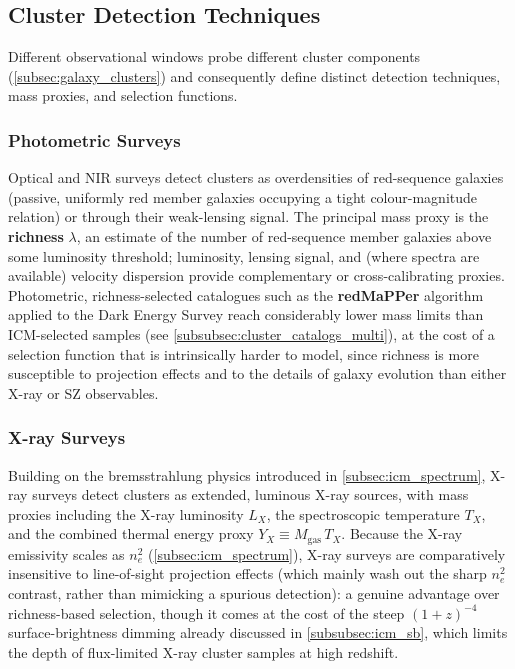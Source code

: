 \vspace{-0.5em}

\subsection{Cluster Detection Techniques} \label{subsec:cluster_detection}

Different observational windows probe different cluster components (\cref{subsec:galaxy_clusters}) and consequently define distinct detection techniques, mass proxies, and selection functions.

\subsubsection{Photometric Surveys} \label{subsubsec:photometric_detection}

Optical and NIR surveys detect clusters as overdensities of red-sequence galaxies (passive, uniformly red member galaxies occupying a tight colour-magnitude relation) or through their weak-lensing signal. The principal mass proxy is the \textbf{richness} $\lambda$, an estimate of the number of red-sequence member galaxies above some luminosity threshold; luminosity, lensing signal, and (where spectra are available) velocity dispersion provide complementary or cross-calibrating proxies. Photometric, richness-selected catalogues such as the \textbf{redMaPPer} algorithm applied to the Dark Energy Survey reach considerably lower mass limits than ICM-selected samples (see \cref{subsubsec:cluster_catalogs_multi}), at the cost of a selection function that is intrinsically harder to model, since richness is more susceptible to projection effects and to the details of galaxy evolution than either X-ray or SZ observables.


\subsubsection{X-ray Surveys} \label{subsubsec:xray_detection}

Building on the bremsstrahlung physics introduced in \cref{subsec:icm_spectrum}, X-ray surveys detect clusters as extended, luminous X-ray sources, with mass proxies including the X-ray luminosity $L_X$, the spectroscopic temperature $T_X$, and the combined thermal energy proxy $Y_X \equiv M_{\text{gas}}\,T_X$. Because the X-ray emissivity scales as $n_e^2$ (\cref{subsec:icm_spectrum}), X-ray surveys are comparatively insensitive to line-of-sight projection effects (which mainly wash out the sharp $n_e^2$ contrast, rather than mimicking a spurious detection): a genuine advantage over richness-based selection, though it comes at the cost of the steep $(1+z)^{-4}$ surface-brightness dimming already discussed in \cref{subsubsec:icm_sb}, which limits the depth of flux-limited X-ray cluster samples at high redshift.


